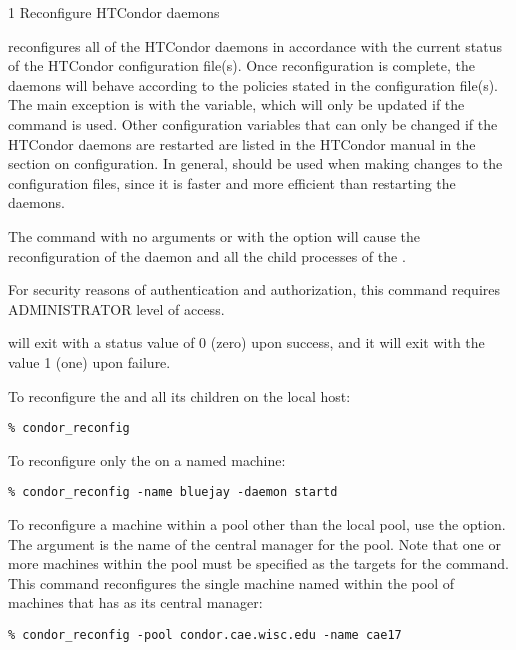 \begin{ManPage}{\label{man-condor-reconfig}}{1}
{Reconfigure HTCondor daemons}
\Synopsis {}
\ToolArgsBase

\ToolDebugOption
\ToolWhere
\ToolArgsAffect


\Description 

 reconfigures all of the HTCondor daemons in accordance with 
the current
status of the HTCondor configuration file(s).  
Once reconfiguration is complete, the daemons will behave according to
the policies stated in the configuration file(s).
The main exception is with the  variable,
which will only be
updated if the  command is used.  
Other configuration variables that can only be changed
if the HTCondor daemons are restarted are listed in
the HTCondor manual in the section on configuration.
In general,  should be used when making changes to
the configuration files, since it is faster and more efficient than
restarting the daemons.

The command 
with no arguments or with the  option 
will cause the reconfiguration of the 
daemon and all the child processes of the .

For security reasons of authentication and authorization,
this command requires ADMINISTRATOR level of access.

\begin{Options}
    \ToolArgsBaseDesc
    \ToolDebugDesc
    \ToolArgsLocateDesc
    \ToolArgsAffectDesc
\end{Options}

\ExitStatus

 will exit with a status value of 0 (zero) upon success,
and it will exit with the value 1 (one) upon failure.

\Examples
To reconfigure the  and all its children
on the local host:
\begin{verbatim}
% condor_reconfig
\end{verbatim}

To reconfigure only the  on a named machine:
\begin{verbatim}
% condor_reconfig -name bluejay -daemon startd
\end{verbatim}

To reconfigure a machine within a pool
other than the local pool, use the  option.
The argument is the name of the central manager for the pool.
Note that one or more machines within the pool must be
specified as the targets for the command.
This command reconfigures
the single machine named  within the
pool of machines that has  as
its central manager:
\begin{verbatim}
% condor_reconfig -pool condor.cae.wisc.edu -name cae17
\end{verbatim}

\end{ManPage}
